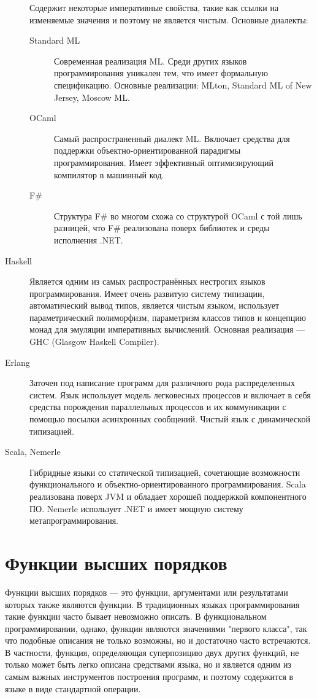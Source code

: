 \documentclass[a4paper]{article}
\begin{document}
\begin{description}
  Содержит некоторые императивные свойства, такие как ссылки на
  изменяемые значения и поэтому не является чистым. Основные диалекты:
  \begin{description}
    \item[Standard ML] Современная реализация ML. Среди других языков
      программирования уникален тем, что имеет формальную
      спецификацию. Основные реализации: MLton, Standard ML of New
      Jersey, Moscow ML.
    \item[OCaml] Самый распространенный диалект ML. Включает средства
      для поддержки объектно-ори\-ен\-ти\-ро\-ван\-ной парадигмы
      программирования. Имеет эффективный оптимизирующий компилятор в
      машинный код.
    \item[F\#] Структура F\# во многом схожа со структурой OCaml с той
      лишь разницей, что F\# реализована поверх библиотек и среды
      исполнения .NET.
  \end{description}
\item[Haskell] Является одним из самых распространённых нестрогих
  языков программирования. Имеет очень развитую систему типизации,
  автоматический вывод типов, является чистым языком, использует
  параметрический полиморфизм, параметризм классов типов и концепцию
  монад для эмуляции императивных вычислений. Основная реализация ---
  GHC (Glasgow Haskell Compiler).
\item[Erlang] Заточен под написание программ для различного рода
  распределенных систем. Язык использует модель легковесных процессов
  и включает в себя средства порождения параллельных процессов и их
  коммуникации с помощью посылки асинхронных сообщений. Чистый язык с
  динамической типизацией.
\item[Scala, Nemerle] Гибридные языки со статической типизацией,
  сочетающие возможности функционального и объектно-ориентированного
  программирования. Scala реализована поверх JVM и обладает хорошей
  поддержкой компонентного ПО. Nemerle использует .NET и имеет мощную
  систему метапрограммирования.
\end{description}

\section{Функции высших порядков}
Функции высших порядков --- это функции, аргументами или результатами
которых также являются функции. В традиционных языках программирования
такие функции часто бывает невозможно описать. В функциональном
программировании, однако, функции являются значениями "первого
класса", так что подобные описания не только возможны, но и достаточно
часто встречаются. В частности, функция, определяющая суперпозицию
двух других функций, не только может быть легко описана средствами
языка, но и является одним из самым важных инструментов построения
программ, и поэтому содержится в языке в виде стандартной операции.
\end{document}
